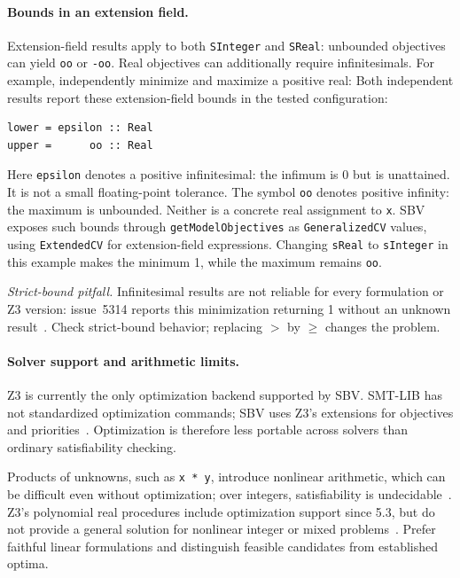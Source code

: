 \documentclass[review]{jfp-epi}
\newcommand{\code}[1]{\texttt{#1}}
\begin{document}
\paragraph{Bounds in an extension field.}
Extension-field results apply to both \code{SInteger} and \code{SReal}:
unbounded objectives can yield \code{oo} or \code{-oo}. Real objectives can
additionally require infinitesimals. For example, independently minimize and
maximize a positive real:
Both independent results report these extension-field bounds in the tested configuration:
\begin{lstlisting}[style=output]
lower = epsilon :: Real
upper =      oo :: Real
\end{lstlisting}
Here \code{epsilon} denotes a positive infinitesimal: the infimum is 0 but is
unattained. It is not a small floating-point tolerance. The symbol \code{oo}
denotes positive infinity: the maximum is unbounded. Neither is a concrete
real assignment to \code{x}. SBV exposes such bounds through
\code{getModelObjectives} as \code{GeneralizedCV} values, using \code{ExtendedCV}
for extension-field expressions.
Changing \code{sReal} to \code{sInteger} in this example makes the minimum 1,
while the maximum remains \code{oo}.

\emph{Strict-bound pitfall.} Infinitesimal results are not reliable for every
formulation or Z3 version: issue~5314 reports this minimization returning 1
without an unknown result~\citep{z3strictbounds}. Check strict-bound behavior;
replacing $>$ by $\geq$ changes the problem.

\paragraph{Solver support and arithmetic limits.}
Z3 is currently the only optimization backend supported by SBV. SMT-LIB has
not standardized optimization commands; SBV uses Z3's extensions for objectives
and priorities~\citep{z3optimization}. Optimization is therefore less portable
across solvers than ordinary satisfiability checking.

Products of unknowns, such as \code{x * y}, introduce nonlinear arithmetic,
which can be difficult even without optimization; over integers, satisfiability
is undecidable~\citep{z3arithmetic}. Z3's polynomial real procedures include
optimization support since 5.3, but do not provide a general solution for
nonlinear integer or mixed problems~\citep{z3optimization}. Prefer faithful
linear formulations and distinguish feasible candidates from established optima.
\end{document}
